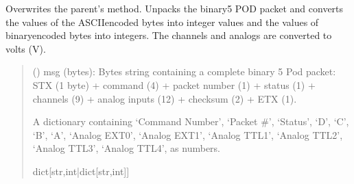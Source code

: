 \documentclass[letterpaper,10pt,english]{sphinxmanual}
\begin{document}
\begin{fulllineitems}
\begin{fulllineitems}
\label{\detokenize{PodDevice_8401HR:PodDevice_8401HR.POD_8401HR.TranslatePODpacket_Binary}}
\pysigstartsignatures
{}
\pysigstopsignatures
\sphinxAtStartPar
Overwrites the parent’s method. Unpacks the binary5 POD packet and converts the values of the         ASCII\sphinxhyphen{}encoded bytes into integer values and the values of binary\sphinxhyphen{}encoded bytes into integers. The         channels and analogs are converted to volts (V).
\begin{quote}\begin{description}
\sphinxAtStartPar
{} () \textendash{} msg (bytes): Bytes string containing a complete binary 5 Pod packet: STX (1 byte)                 + command (4) + packet number (1) + status (1) + channels (9) + analog inputs (12)                 + checksum (2) + ETX (1).

\sphinxAtStartPar
A dictionary containing ‘Command Number’, ‘Packet \#’, ‘Status’,                 ‘D’, ‘C’, ‘B’, ‘A’, ‘Analog EXT0’,  ‘Analog EXT1’, ‘Analog TTL1’, ‘Analog TTL2’,                 ‘Analog TTL3’, ‘Analog TTL4’, as numbers.

\sphinxAtStartPar
dict{[}str,int|dict{[}str,int{]}{]}

\end{description}\end{quote}

\end{fulllineitems}



\end{fulllineitems}
\end{document}
